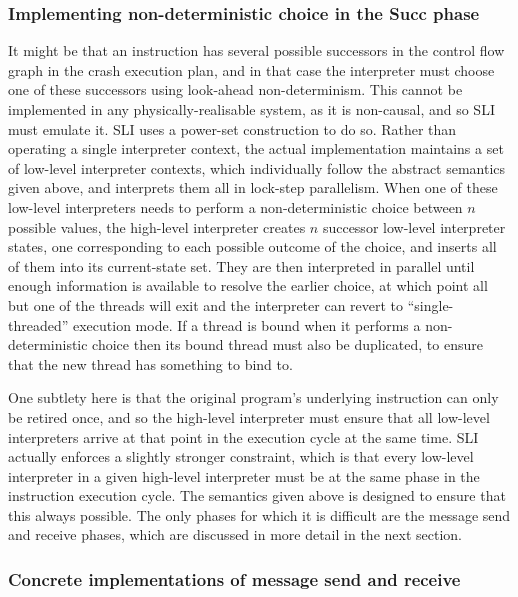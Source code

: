 
\subsubsection{Implementing non-deterministic choice in the Succ phase}

It might be that an instruction has several possible successors in the
control flow graph in the crash execution plan, and in that case the
interpreter must choose one of these successors using look-ahead
non-determinism.  This cannot be implemented in any
physically-realisable system, as it is non-causal, and so SLI must
emulate it.  SLI uses a power-set construction to do so.  Rather than
operating a single interpreter context, the actual implementation
maintains a set of low-level interpreter contexts, which individually
follow the abstract semantics given above, and interprets them all in
lock-step parallelism.  When one of these low-level interpreters needs
to perform a non-deterministic choice between $n$ possible values, the
high-level interpreter creates $n$ successor low-level interpreter
states, one corresponding to each possible outcome of the choice, and
inserts all of them into its current-state set.  They are then
interpreted in parallel until enough information is available to
resolve the earlier choice, at which point all but one of the threads
will exit and the interpreter can revert to ``single-threaded''
execution mode.  If a thread is bound when it performs a
non-deterministic choice then its bound thread must also be
duplicated, to ensure that the new thread has something to bind to.

One subtlety here is that the original program's underlying
instruction can only be retired once, and so the high-level
interpreter must ensure that all low-level interpreters arrive at that
point in the execution cycle at the same time.  SLI actually enforces
a slightly stronger constraint, which is that every low-level
interpreter in a given high-level interpreter must be at the same
phase in the instruction execution cycle.  The semantics given above
is designed to ensure that this always possible.  The only phases for
which it is difficult are the message send and receive phases, which
are discussed in more detail in the next section.

\subsubsection{Concrete implementations of message send and receive}

